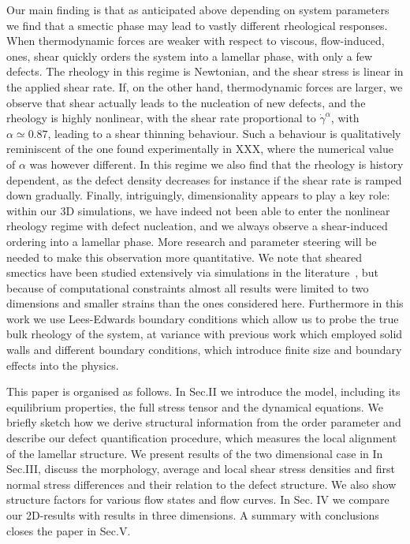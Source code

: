 \documentclass[8.5pt,twoside,twocolumn]{article}
\begin{document}
Our main finding is that as anticipated above depending on system parameters we find that a smectic phase may lead to vastly different rheological responses. 
When thermodynamic forces are weaker with respect to viscous, flow-induced, ones, shear quickly orders the system into a lamellar phase, with only a few defects. The rheology in this regime is Newtonian, and the shear stress is linear in the applied shear rate. If, on the other hand, thermodynamic forces are larger, we observe that shear actually leads to the nucleation of new defects, and the rheology is highly nonlinear, with the shear rate proportional to $\dot{\gamma}^{\alpha}$, with $\alpha\simeq 0.87$, leading to a shear thinning behaviour. Such a behaviour is qualitatively reminiscent of the one found experimentally in XXX, where the numerical value of $\alpha$ was however different. In this regime we also find that the rheology is history dependent, as the defect density decreases for instance if the shear rate is ramped down gradually. Finally, intriguingly, dimensionality appears to play a key role: within our 3D simulations, we have indeed not been able to enter the nonlinear rheology regime with defect nucleation, and we always observe a shear-induced ordering into a lamellar phase. More research and parameter steering will be needed to make this observation more quantitative.
We note that sheared smectics have been studied extensively via simulations in the literature~\cite{Swift96,Gonnella97,Gonnella98,Xu03,Xu05,Xu06a,Xu06b}, but because of computational constraints almost all results were limited to two dimensions and smaller strains than the ones considered here. Furthermore in this work we use Lees-Edwards boundary conditions which allow us to probe the true bulk rheology of the system, at variance with previous work which employed solid walls and different boundary conditions, which introduce finite size and boundary effects into the physics.
 
This paper is organised as follows. In Sec.II we introduce the model, including its equilibrium properties, the full stress tensor and the dynamical equations.
We briefly sketch how we derive structural information from the order parameter and describe our defect quantification procedure, which measures the local alignment of the lamellar structure.
We present results of the two dimensional case in In Sec.III, discuss the morphology, average and local shear stress densities and first normal stress differences and their relation to the defect structure.
We also show structure factors for various flow states and flow curves.
In Sec. IV we compare our 2D-results with results in three dimensions. 
A summary with conclusions closes the paper in Sec.V.
\end{document}
